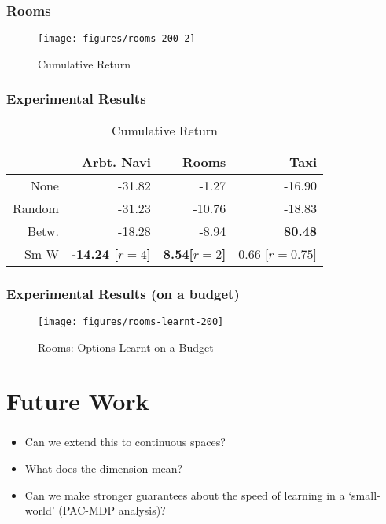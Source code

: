 \documentclass{beamer}
\begin{document}
\begin{frame}
    \frametitle{Rooms}
    \label{frame:results-rooms-results}
    \begin{figure}[h]
        \centering
        \texttt{[image: figures/rooms-200-2]}
        \label{fig:rooms-return}
        \caption{Cumulative Return}
    \end{figure}
\end{frame}

\begin{frame}
    \frametitle{Experimental Results}
\begin{table}
 \centering
 \begin{tabular}{ r | r r r }
             & Arbt. Navi           & Rooms               & Taxi                  \\ \hline
   None      & -31.82               &  -1.27              & -16.90                \\
   Random    & -31.23               & -10.76              & -18.83                \\
   Betw.     & -18.28               & -8.94               &  {\bf 80.48}          \\
   Sm-W      & {\bf -14.24 [$r=4$]} & {\bf 8.54[$r=2$]}   &   0.66 [$r=0.75$]     \\
 \end{tabular}
 \caption{Cumulative Return}
 \label{tbl:optimal-returns}
\end{table}
\end{frame}

\begin{frame}
    \frametitle{Experimental Results (on a budget)}

\begin{figure}[th]
  \centering
    \texttt{[image: figures/rooms-learnt-200]}
      \label{fig:rooms-learnt}
    \caption{Rooms: Options Learnt on a Budget}
\end{figure}
\end{frame}

\section{Future Work}

\begin{frame}
    \frametitle{}
    \label{frame:future-questions}
    
    \begin{itemize}
        \item Can we extend this to continuous spaces?
        \item What does the dimension mean?
        \item Can we make stronger guarantees about the speed of learning in a
            `small-world' (PAC-MDP analysis)?
    \end{itemize}
\end{frame}
\end{document}
